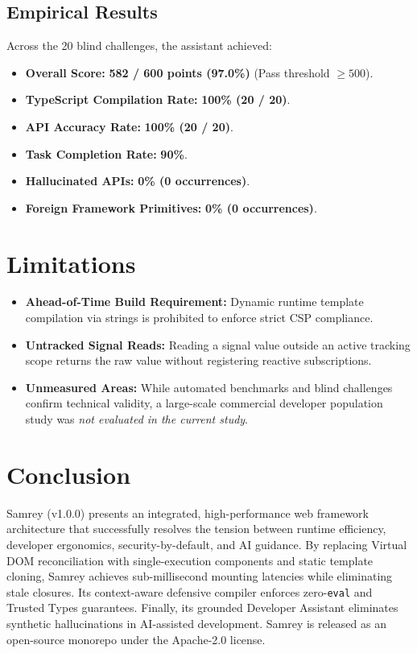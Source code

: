 \documentclass[10pt,journal,compsoc]{IEEEtran}
\begin{document}
\subsection{Empirical Results}
Across the 20 blind challenges, the assistant achieved:
\begin{itemize}
    \item \textbf{Overall Score:} \textbf{582 / 600 points (97.0\%)} (Pass threshold $\ge 500$).
    \item \textbf{TypeScript Compilation Rate:} \textbf{100\% (20 / 20)}.
    \item \textbf{API Accuracy Rate:} \textbf{100\% (20 / 20)}.
    \item \textbf{Task Completion Rate:} \textbf{90\%}.
    \item \textbf{Hallucinated APIs:} \textbf{0\% (0 occurrences)}.
    \item \textbf{Foreign Framework Primitives:} \textbf{0\% (0 occurrences)}.
\end{itemize}

\section{Limitations}
\begin{itemize}
    \item \textbf{Ahead-of-Time Build Requirement:} Dynamic runtime template compilation via strings is prohibited to enforce strict CSP compliance.
    \item \textbf{Untracked Signal Reads:} Reading a signal value outside an active tracking scope returns the raw value without registering reactive subscriptions.
    \item \textbf{Unmeasured Areas:} While automated benchmarks and blind challenges confirm technical validity, a large-scale commercial developer population study was \textit{not evaluated in the current study}.
\end{itemize}

\section{Conclusion}
Samrey (v1.0.0) presents an integrated, high-performance web framework architecture that successfully resolves the tension between runtime efficiency, developer ergonomics, security-by-default, and AI guidance. By replacing Virtual DOM reconciliation with single-execution components and static template cloning, Samrey achieves sub-millisecond mounting latencies while eliminating stale closures. Its context-aware defensive compiler enforces zero-\texttt{eval} and Trusted Types guarantees. Finally, its grounded Developer Assistant eliminates synthetic hallucinations in AI-assisted development. Samrey is released as an open-source monorepo under the Apache-2.0 license.
\end{document}

